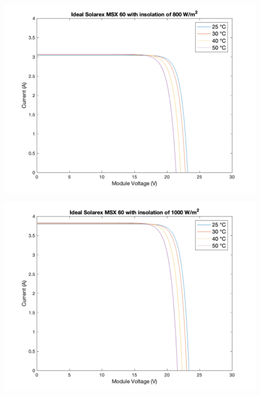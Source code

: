 \documentclass[fleqn]{article}
\begin{document}
\begin{enumerate}
\begin{center}
  \end{center}
  \begin{center}
    \includegraphics[width=0.9\linewidth]{800W-i.png}
  \end{center}
  \begin{center}
    \includegraphics[width=0.9\linewidth]{1000W-i.png}
  \end{center}


\end{enumerate}
\end{document}
